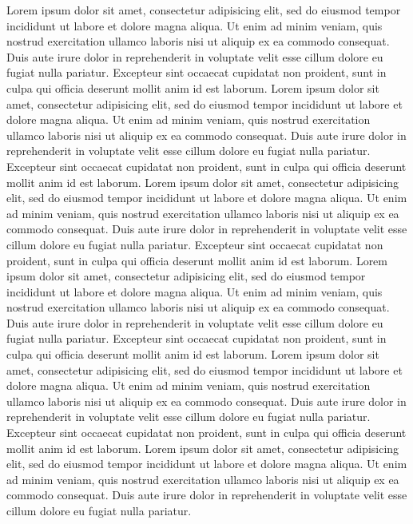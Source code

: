 \documentclass{modernCS}
\begin{document}
Lorem ipsum dolor sit amet, consectetur adipisicing elit, sed do eiusmod
tempor incididunt ut labore et dolore magna aliqua. Ut enim ad minim veniam,
quis nostrud exercitation ullamco laboris nisi ut aliquip ex ea commodo
consequat. Duis aute irure dolor in reprehenderit in voluptate velit esse
cillum dolore eu fugiat nulla pariatur. Excepteur sint occaecat cupidatat non
proident, sunt in culpa qui officia deserunt mollit anim id est laborum.
Lorem ipsum dolor sit amet, consectetur adipisicing elit, sed do eiusmod
tempor incididunt ut labore et dolore magna aliqua. Ut enim ad minim veniam,
quis nostrud exercitation ullamco laboris nisi ut aliquip ex ea commodo
consequat. Duis aute irure dolor in reprehenderit in voluptate velit esse
cillum dolore eu fugiat nulla pariatur. Excepteur sint occaecat cupidatat non
proident, sunt in culpa qui officia deserunt mollit anim id est laborum.
Lorem ipsum dolor sit amet, consectetur adipisicing elit, sed do eiusmod
tempor incididunt ut labore et dolore magna aliqua. Ut enim ad minim veniam,
quis nostrud exercitation ullamco laboris nisi ut aliquip ex ea commodo
consequat. Duis aute irure dolor in reprehenderit in voluptate velit esse
cillum dolore eu fugiat nulla pariatur. Excepteur sint occaecat cupidatat non
proident, sunt in culpa qui officia deserunt mollit anim id est laborum.
Lorem ipsum dolor sit amet, consectetur adipisicing elit, sed do eiusmod
tempor incididunt ut labore et dolore magna aliqua. Ut enim ad minim veniam,
quis nostrud exercitation ullamco laboris nisi ut aliquip ex ea commodo
consequat. Duis aute irure dolor in reprehenderit in voluptate velit esse
cillum dolore eu fugiat nulla pariatur. Excepteur sint occaecat cupidatat non
proident, sunt in culpa qui officia deserunt mollit anim id est laborum.
Lorem ipsum dolor sit amet, consectetur adipisicing elit, sed do eiusmod
tempor incididunt ut labore et dolore magna aliqua. Ut enim ad minim veniam,
quis nostrud exercitation ullamco laboris nisi ut aliquip ex ea commodo
consequat. Duis aute irure dolor in reprehenderit in voluptate velit esse
cillum dolore eu fugiat nulla pariatur. Excepteur sint occaecat cupidatat non
proident, sunt in culpa qui officia deserunt mollit anim id est laborum.
Lorem ipsum dolor sit amet, consectetur adipisicing elit, sed do eiusmod
tempor incididunt ut labore et dolore magna aliqua. Ut enim ad minim veniam,
quis nostrud exercitation ullamco laboris nisi ut aliquip ex ea commodo
consequat. Duis aute irure dolor in reprehenderit in voluptate velit esse
cillum dolore eu fugiat nulla pariatur.
\end{document}
